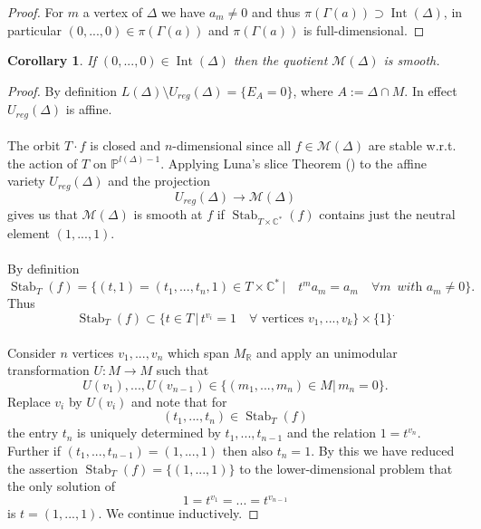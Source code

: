 \documentclass[12pt, english]{article}
\newtheorem{corollar}[definition]{Corollary}
\DeclareMathOperator{\Stab}{Stab}
\DeclareMathOperator{\Int}{Int}
\begin{document}
\begin{proof}
	For $m$ a vertex of $\Delta$ we have $a_m \neq 0$ and thus $\pi(\Gamma(a)) \supset \Int(\Delta)$, in particular $(0,...,0) \in \pi(\Gamma(a))$ and $\pi(\Gamma(a))$ is full-dimensional.
\end{proof}


\begin{corollar} \label{corollary_stable_nondeg_point_automatically_smooth}
	If $(0,...,0) \in \Int(\Delta)$ then the quotient $\mathcal{M}(\Delta)$ is smooth.
\end{corollar}


\begin{proof}
	By definition $L(\Delta) \setminus U_{reg}(\Delta) = \{E_A = 0\}$, where $A := \Delta \cap M$. In effect $U_{reg}(\Delta)$ is affine.
	\\ \\
	The orbit $T \cdot f$ is closed and $n$-dimensional since all $f \in \mathcal{M}(\Delta)$ are stable w.r.t. the action of $T$ on $\mathbb{P}^{l(\Delta) -1}$. Applying Luna's slice Theorem (\cite[Prop.5.7]{Dre12}) to the affine variety $U_{reg}(\Delta)$ and the projection
	\[ U_{reg}(\Delta) \rightarrow \mathcal{M}(\Delta)  \]
	gives us that $\mathcal{M}(\Delta)$ is smooth at $f$ if $\Stab_{T \times \mathbb{C}^*}(f)$ contains just the neutral element $(1,...,1)$. \\ \\
	By definition
	\[ \Stab_T(f) = \{ (t,1) = (t_1,...,t_n,1) \in T \times \mathbb{C}^*  \, | \quad t^m  a_m = a_m  \quad \forall m \, \textit{ with } a_m \neq 0  \}.  \]
	Thus
	\[ \Stab_T(f) \subset  \{ t \in T \, | \, t^{v_i} = 1 \quad \forall \textrm{ vertices } v_1,...,v_k   \} \times \{1\}^. \]
	\leavevmode
	\\
	Consider $n$ vertices $v_1,...,v_n$ which span $M_{\mathbb{R}}$ and apply an unimodular transformation $U: M \rightarrow M$ such that 
	\[ U(v_1),...,U(v_{n-1}) \in \{ (m_1,...,m_n) \in M| \, m_n = 0 \}. \] 
	Replace $v_i$ by $U(v_i)$ and note that for
	\[ (t_1,...,t_n) \in \Stab_T(f) \] 
	the entry $t_n$ is uniquely determined by $t_1,...,t_{n-1}$ and the relation
	$1 = t^{v_n}$. Further if $(t_1,...,t_{n-1}) = (1,...,1)$ then also $t_n = 1$. By this we have reduced the assertion $\Stab_T(f) = \{(1,...,1)\}$ to the lower-dimensional problem that the only solution of
	\[ 1 = t^{v_1} = ... = t^{v_{n-1}}  \]
	is $t= (1,...,1)$. We continue inductively.
	
\end{proof}
\end{document}
